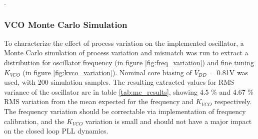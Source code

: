 {\color{white}.}\FloatBarrier
	\subsubsection{VCO Monte Carlo Simulation}
	To characterize the effect of process variation on the implemented oscillator, a Monte Carlo simulation of process variation and mismatch was run to extract a distribution for oscillator frequency (in figure \ref{fig:freq_variation}) and fine tuning $K_{VCO}$ (in figure \ref{fig:kvco_variation}). Nominal core biasing of $V_{DD}$ = 0.81V was used, with 200 simulation samples. The resulting extracted values for RMS variance of the oscillator are in table \ref{tab:mc_results}, showing 4.5 \% and 4.67 \% RMS variation from the mean expected for the frequency and $K_{VCO}$ respectively. The frequency variation should be correctable via implementation of frequency calibration, and the $K_{VCO}$ variation is small and should not have a major impact on the closed loop PLL dynamics. 
